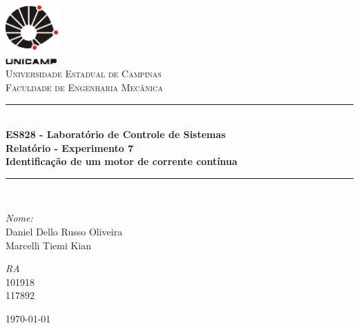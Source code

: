 
\begin{titlepage}
\begin{center}

\newcommand{\HRule}{\rule{\linewidth}{0.5mm}}
\includegraphics[width=0.15\textwidth]{logoUnicamp}~\\[1cm]

\textsc{\LARGE Universidade Estadual de Campinas}\\[1.5cm]

\textsc{\Large Faculdade de Engenharia Mecânica}\\[0.5cm]

\HRule \\[0.4cm]
{ \huge \bfseries ES828 - Laboratório de Controle de Sistemas\\ \vspace{1cm} Relatório - Experimento 7 \\
\Large{Identificação de um motor de corrente contínua} \\[0.4cm] }

\HRule \\[1.5cm]

\begin{minipage}{0.6\textwidth}
\begin{flushleft} \large
\emph{Nome:}\\
Daniel Dello Russo Oliveira\\ Marcelli Tiemi Kian
\end{flushleft}
\end{minipage}
\begin{minipage}{0.2\textwidth}
\begin{flushright} \large
\emph{RA}\\ 101918\\
117892
\end{flushright}
\end{minipage}

\vfill

{\large \today}

\end{center}
\end{titlepage}
